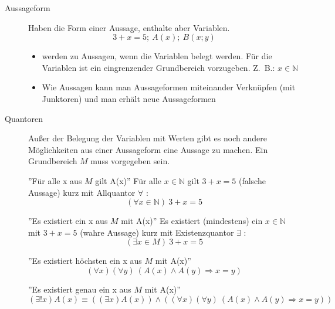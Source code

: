 \begin{description}
    \item[Aussageform] Haben die Form einer Aussage, enthalte aber Variablen.
    \[3 + x = 5;\ A(x);\ B(x;y)\]
    \begin{itemize}
        \item werden zu Aussagen, wenn die Variablen belegt werden.
        Für die Variablen ist ein eingrenzender Grundbereich vorzugeben.
        Z.~B.: $x \in \mathbb{N}$
        \item Wie Aussagen kann man Aussageformen miteinander Verknüpfen (mit Junktoren) und man erhält neue Aussageformen
    \end{itemize}
    \item[Quantoren] Außer der Belegung der Variablen mit Werten gibt es noch andere Möglichkeiten aus einer Aussageform eine Aussage zu machen.
    Ein Grundbereich $M$ muss vorgegeben sein.

    ''Für alle x aus $M$ gilt A(x)'' \newline
    Für alle $x \in \mathbb{N}$ gilt $3 + x = 5$ (falsche Aussage) kurz mit Allquantor $\forall$ :
    \[(\forall x \in \mathbb{N})\ 3 + x = 5\]

    ''Es existiert ein x aus $M$ mit A(x)'' \newline
    Es existiert (mindestens) ein $x \in \mathbb{N}$ mit $3 + x = 5$ (wahre Aussage) kurz mit Existenzquantor $\exists$ :
    \[(\exists x \in M)\ 3 + x = 5\]

    ''Es existiert höchsten ein x aus $M$ mit A(x)''
    \[(\forall x)(\forall y)\ (A(x) \wedge A(y) \Rightarrow x = y)\]

    ''Es existiert genau ein x aus $M$ mit A(x)''
    \[(\exists ! x) A(x) \equiv ((\exists x) A(x)) \wedge ((\forall x)(\forall y)\ (A(x) \wedge A(y) \Rightarrow x = y))\]
\end{description}
